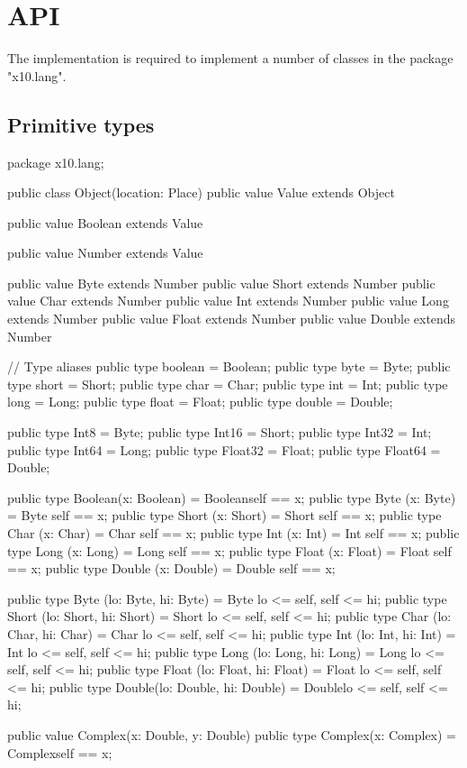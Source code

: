 \chapter{API}\label{XtenAPI}

The \Xten{} implementation is required to implement a number of
classes in the package \xcd"x10.lang".

\section{Primitive types}

\begin{xten}
package x10.lang;

public class Object(location: Place) { }
public value Value extends Object { }

public value Boolean extends Value { }

public value Number  extends Value { }

public value Byte    extends Number { }
public value Short   extends Number { }
public value Char    extends Number { }
public value Int     extends Number { }
public value Long    extends Number { }
public value Float   extends Number { }
public value Double  extends Number { }

// Type aliases
public type boolean = Boolean;
public type byte = Byte;
public type short = Short;
public type char = Char;
public type int = Int;
public type long = Long;
public type float = Float;
public type double = Double;

public type Int8    = Byte;
public type Int16   = Short;
public type Int32   = Int;
public type Int64   = Long;
public type Float32 = Float;
public type Float64 = Double;

public type Boolean(x: Boolean) = Boolean{self == x};
public type Byte   (x: Byte)    = Byte   {self == x};
public type Short  (x: Short)   = Short  {self == x};
public type Char   (x: Char)    = Char   {self == x};
public type Int    (x: Int)     = Int    {self == x};
public type Long   (x: Long)    = Long   {self == x};
public type Float  (x: Float)   = Float  {self == x};
public type Double (x: Double)  = Double {self == x};

public type Byte  (lo: Byte,   hi: Byte)  
          = Byte  {lo <= self, self <= hi};
public type Short (lo: Short,  hi: Short) 
          = Short {lo <= self, self <= hi};
public type Char  (lo: Char,   hi: Char)  
          = Char  {lo <= self, self <= hi};
public type Int   (lo: Int,    hi: Int)   
          = Int   {lo <= self, self <= hi};
public type Long  (lo: Long,   hi: Long)  
          = Long  {lo <= self, self <= hi};
public type Float (lo: Float,  hi: Float) 
          = Float {lo <= self, self <= hi};
public type Double(lo: Double, hi: Double)
          = Double{lo <= self, self <= hi};

public value Complex(x: Double, y: Double) { }
public type Complex(x: Complex) = Complex{self == x};
\end{xten}

